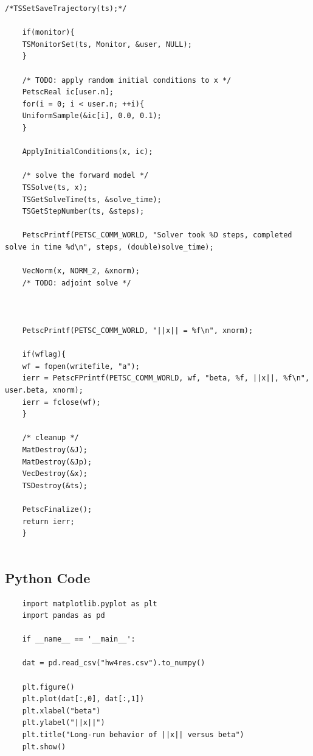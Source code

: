 \documentclass[]{article}
\begin{document}
\begin{Verbatim}[xleftmargin=-5cm]
	/*TSSetSaveTrajectory(ts);*/
	
	if(monitor){
	TSMonitorSet(ts, Monitor, &user, NULL);
	}
	
	/* TODO: apply random initial conditions to x */
	PetscReal ic[user.n];
	for(i = 0; i < user.n; ++i){
	UniformSample(&ic[i], 0.0, 0.1);
	}
	
	ApplyInitialConditions(x, ic);
	
	/* solve the forward model */
	TSSolve(ts, x);
	TSGetSolveTime(ts, &solve_time);
	TSGetStepNumber(ts, &steps);
	
	PetscPrintf(PETSC_COMM_WORLD, "Solver took %D steps, completed solve in time %d\n", steps, (double)solve_time);
	
	VecNorm(x, NORM_2, &xnorm);
	/* TODO: adjoint solve */
	
	
	
	PetscPrintf(PETSC_COMM_WORLD, "||x|| = %f\n", xnorm);
	
	if(wflag){
	wf = fopen(writefile, "a");
	ierr = PetscFPrintf(PETSC_COMM_WORLD, wf, "beta, %f, ||x||, %f\n", user.beta, xnorm);
	ierr = fclose(wf);
	}
	
	/* cleanup */
	MatDestroy(&J);
	MatDestroy(&Jp);
	VecDestroy(&x);
	TSDestroy(&ts);
	
	PetscFinalize();
	return ierr;
	}
	
	\end{Verbatim}
	
	\subsection*{Python Code}
	\begin{Verbatim}
	import matplotlib.pyplot as plt
	import pandas as pd
	
	if __name__ == '__main__':
	
	dat = pd.read_csv("hw4res.csv").to_numpy()
	
	plt.figure()
	plt.plot(dat[:,0], dat[:,1])
	plt.xlabel("beta")
	plt.ylabel("||x||")
	plt.title("Long-run behavior of ||x|| versus beta")
	plt.show()
	\end{Verbatim}
\end{document}
